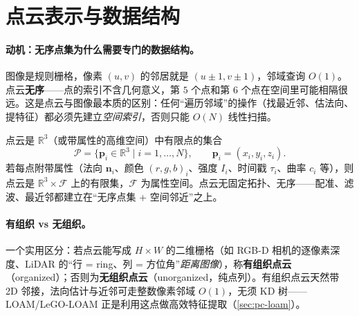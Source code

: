 \section{点云表示与数据结构}
\label{sec:pc-rep}

\paragraph{动机：无序点集为什么需要专门的数据结构。}
图像是规则栅格，像素 $(u,v)$ 的邻居就是 $(u\pm1,v\pm1)$，邻域查询 $O(1)$。点云\textbf{无序}——点的索引不含几何意义，第 $5$ 个点和第 $6$ 个点在空间里可能相隔很远。这是点云与图像最本质的区别：任何“遍历邻域”的操作（找最近邻、估法向、提特征）都必须先建立\emph{空间索引}，否则只能 $O(N)$ 线性扫描。

\begin{definition}[点云]\label{def:pc-cloud}
点云是 $\mathbb{R}^3$（或带属性的高维空间）中有限点的集合
\begin{equation}
  \mathcal{P}=\{\mathbf{p}_i\in\mathbb{R}^3\mid i=1,\dots,N\},\qquad \mathbf{p}_i=(x_i,y_i,z_i).
  \label{eq:pc-def}
\end{equation}
若每点附带属性（法向 $\mathbf{n}_i$、颜色 $(r,g,b)_i$、强度 $I_i$、时间戳 $\tau_i$、曲率 $c_i$ 等），则点云是 $\mathbb{R}^3\times\mathcal{F}$ 上的有限集，$\mathcal{F}$ 为属性空间。点云无固定拓扑、无序——配准、滤波、最近邻都建立在“无序点集 + 空间邻近”之上。
\end{definition}

\paragraph{有组织 vs 无组织。}
一个实用区分：若点云能写成 $H\times W$ 的二维栅格（如 RGB-D 相机的逐像素深度、LiDAR 的“行 = ring、列 = 方位角”\emph{距离图像}），称\textbf{有组织点云}（organized）；否则为\textbf{无组织点云}（unorganized，纯点列）\cite{carlone2026handbook}。有组织点云天然带 2D 邻接，法向估计与近邻可走整数像素邻域 $O(1)$，无须 KD 树——LOAM/LeGO-LOAM 正是利用这点做高效特征提取（\cref{sec:pc-loam}）。

